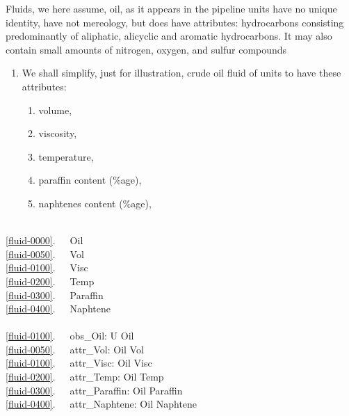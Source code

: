 \begynd
\pind Fluids, we here assume, oil, as it appears in the pipeline units
\begynd
\pind have no unique identity,
\pind have not mereology, 
\pind but does have attributes:  hydrocarbons consisting predominantly of
\begynd
\pind aliphatic, 
\pind alicyclic and 
\pind aromatic hydrocarbons.
\afslut
\pind It may also contain small amounts of 
\begynd
\pind nitrogen, 
\pind oxygen, and
\pind sulfur
\afslut compounds
\afslut
\afslut

\begin{enumerate}\setei
\item \label{fluid-0000} We shall simplify, just for illustration, crude oil fluid of
      units to have these attributes:
\begin{enumerate}
\item \label{fluid-0050} volume,
\item \label{fluid-0100} viscosity,
\item \label{fluid-0200} temperature, 
\item \label{fluid-0300} paraffin content (\%age),
\item \label{fluid-0400} naphtenes content (\%age), 
\end{enumerate}
\savei\end{enumerate}
\begin{multicols}{2}
\bp
{}\\
\ref{fluid-0000}.\ \ \ Oil\\
\ref{fluid-0050}.\ \ \ Vol\\
\ref{fluid-0100}.\ \ \ Visc\ \ \ \\
\ref{fluid-0200}.\ \ \ Temp\\
\ref{fluid-0300}.\ \ \ Paraffin\\
\ref{fluid-0400}.\ \ \ Naphtene\\
\\
\ref{fluid-0100}.\ \ \ obs\_Oil: U {\RIGHTARROW} Oil\\
\ref{fluid-0050}.\ \ \ attr\_Vol: Oil {\RIGHTARROW} Vol\\
\ref{fluid-0100}.\ \ \ attr\_Visc: Oil {\RIGHTARROW} Visc\ \ \ \\
\ref{fluid-0200}.\ \ \ attr\_Temp: Oil {\RIGHTARROW} Temp\\
\ref{fluid-0300}.\ \ \ attr\_Paraffin: Oil {\RIGHTARROW} Paraffin\\
\ref{fluid-0400}.\ \ \ attr\_Naphtene: Oil {\RIGHTARROW} Naphtene\ \ 
\ep
\end{multicols} 



